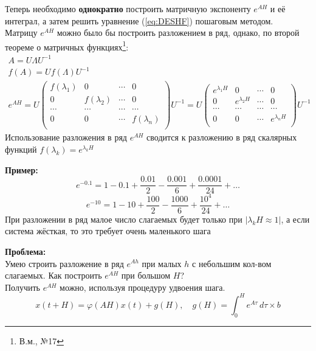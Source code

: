 \documentclass[a4paper,11pt]{article}
\begin{document}
Теперь необходимо \textbf{однократно} построить матричную экспоненту $e^{AH}$ и её интеграл, а затем решить уравнение (\ref{eq:DESHF}) пошаговым методом. \\
Матрицу $e^{AH}$ можно было бы построить разложением в ряд, однако, по второй теореме о матричных функциях\footnote{В.м., №17}:
\begin{gather*}
  A = U\Lambda U^{-1} \\
  f(A) = Uf(\Lambda)U^{-1} \\
  e^{AH} = U
  \begin{pmatrix}
    f(\lambda_1) & 0 & \cdots & 0 \\
    0 & f(\lambda_2) & \cdots & 0 \\
    \cdots & \cdots & \cdots & \cdots \\
    0 & 0 & \cdots & f(\lambda_n) \\
  \end{pmatrix} U^{-1} = U
  \begin{pmatrix}
    e^{\lambda_1H} & 0 & \cdots & 0 \\
    0 & e^{\lambda_2H} & \cdots & 0 \\
    \cdots & \cdots & \cdots & \cdots \\
    0 & 0 & \cdots & e^{\lambda_nH} \\
  \end{pmatrix} U^{-1}
\end{gather*}
Использование разложения в ряд $e^{AH}$ сводится к разложению в ряд скалярных функций $f(\lambda_k) = e^{\lambda_kH}$
\begin{importantblock}
  \textbf{Пример:} \\
  \[e^{-0.1} = 1 - 0.1 + \frac{0.01}{2} - \frac{0.001}{6} + \frac{0.0001}{24} + \dots\]
  \[e^{-10}  = 1 - 10 + \frac{100}{2} - \frac{1000}{6} + \frac{10^4}{24} + \dots\]
  При разложении в ряд малое число слагаемых будет только при $|\lambda_kH \approx 1|$, а если система жёсткая, то это требует очень маленького шага \\
\end{importantblock}
\textbf{Проблема:} \\
Умею строить разложение в ряд $e^{Ah}$ при малых $h$ с небольшим кол-вом слагаемых. Как построить $e^{AH}$ при большом $H$? \\
Получить $e^{AH}$ можно, используя процедуру удвоения шага.
\begin{equation*}
  x(t + H) = \varphi(AH)x(t) + g(H),\quad g(H) = \int_0^H e^{A\tau}\,d\tau \times b \tag{4*}
  \label{eq:DESHD}
\end{equation*}
\end{document}
